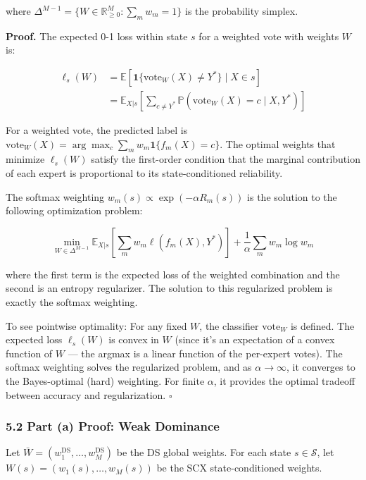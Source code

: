 \documentclass[
  12pt,
]{ctexart}
\begin{document}
where
\(\Delta^{M-1} = \{W \in \mathbb{R}^M_{\geq 0} : \sum_m w_m = 1\}\) is
the probability simplex.

\textbf{Proof.} The expected 0-1 loss within state \(s\) for a weighted
vote with weights \(W\) is:

\[\begin{aligned}
\ell_s(W) &= \mathbb{E}\left[ \mathbf{1}\{\text{vote}_W(X) \neq Y^*\} \;\Big|\; X \in s \right] \\
&= \mathbb{E}_{X|s}\left[ \sum_{c \neq Y^*} \mathbb{P}(\text{vote}_W(X) = c \mid X, Y^*) \right]
\end{aligned}\]

For a weighted vote, the predicted label is
\(\text{vote}_W(X) = \arg\max_c \sum_m w_m \mathbf{1}\{f_m(X) = c\}\).
The optimal weights that minimize \(\ell_s(W)\) satisfy the first-order
condition that the marginal contribution of each expert is proportional
to its state-conditioned reliability.

The softmax weighting \(w_m(s) \propto \exp(-\alpha R_m(s))\) is the
solution to the following optimization problem:

\[\min_{W \in \Delta^{M-1}} \mathbb{E}_{X|s}\left[\sum_m w_m \ell(f_m(X), Y^*)\right] + \frac{1}{\alpha} \sum_m w_m \log w_m\]

where the first term is the expected loss of the weighted combination
and the second is an entropy regularizer. The solution to this
regularized problem is exactly the softmax weighting.

To see pointwise optimality: For any fixed \(W\), the classifier
\(\text{vote}_W\) is defined. The expected loss \(\ell_s(W)\) is convex
in \(W\) (since it's an expectation of a convex function of \(W\) ---
the argmax is a linear function of the per-expert votes). The softmax
weighting solves the regularized problem, and as \(\alpha \to \infty\),
it converges to the Bayes-optimal (hard) weighting. For finite
\(\alpha\), it provides the optimal tradeoff between accuracy and
regularization. \(\square\)

\subsubsection{5.2 Part (a) Proof: Weak
Dominance}\label{part-a-proof-weak-dominance}

Let \(\bar{W} = (w_1^{\text{DS}}, \dots, w_M^{\text{DS}})\) be the DS
global weights. For each state \(s \in \mathcal{S}\), let
\(W(s) = (w_1(s), \dots, w_M(s))\) be the SCX state-conditioned weights.
\end{document}
